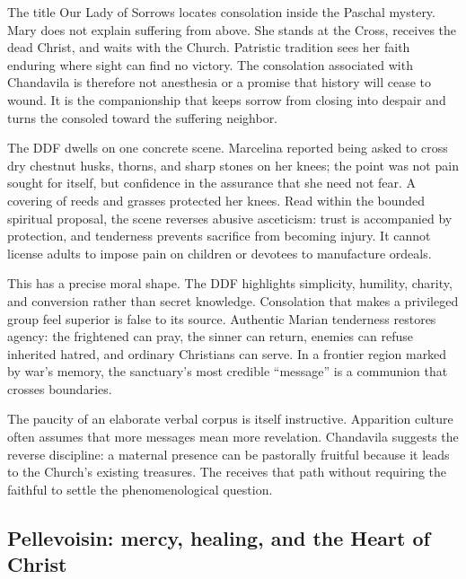 \enlargethispage{\baselineskip}
The title Our Lady of Sorrows locates consolation inside the Paschal mystery. Mary does not explain suffering from above. She stands at the Cross, receives the dead Christ, and waits with the Church. Patristic tradition sees her faith enduring where sight can find no victory. The consolation associated with Chandavila is therefore not anesthesia or a promise that history will cease to wound. It is the companionship that keeps sorrow from closing into despair and turns the consoled toward the suffering neighbor.

The DDF dwells on one concrete scene. Marcelina reported being asked to cross dry chestnut husks, thorns, and sharp stones on her knees; the point was not pain sought for itself, but confidence in the assurance that she need not fear. A covering of reeds and grasses protected her knees. Read within the bounded spiritual proposal, the scene reverses abusive asceticism: trust is accompanied by protection, and tenderness prevents sacrifice from becoming injury. It cannot license adults to impose pain on children or devotees to manufacture ordeals.

This has a precise moral shape. The DDF highlights simplicity, humility, charity, and conversion rather than secret knowledge. Consolation that makes a privileged group feel superior is false to its source. Authentic Marian tenderness restores agency: the frightened can pray, the sinner can return, enemies can refuse inherited hatred, and ordinary Christians can serve. In a frontier region marked by war's memory, the sanctuary's most credible ``message'' is a communion that crosses boundaries.

The paucity of an elaborate verbal corpus is itself instructive. Apparition culture often assumes that more messages mean more revelation. Chandavila suggests the reverse discipline: a maternal presence can be pastorally fruitful because it leads to the Church's existing treasures. The  receives that path without requiring the faithful to settle the phenomenological question.

\subsection{Pellevoisin: mercy, healing, and the Heart of Christ}


